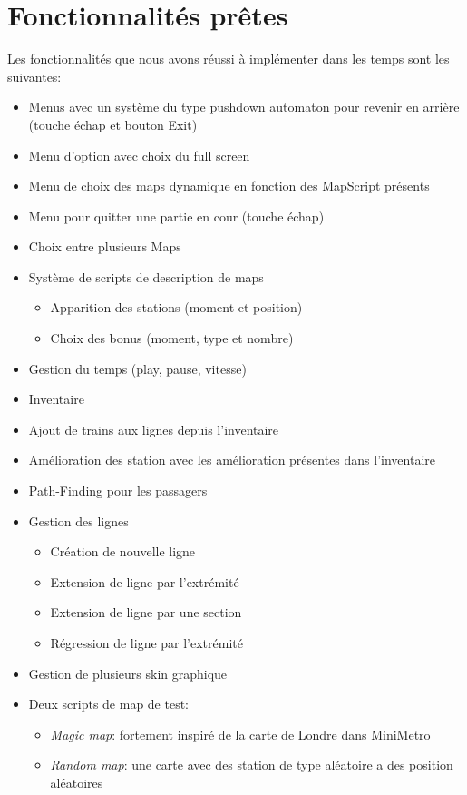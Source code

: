\documentclass[report, backcover, french, nodocumentinfo]{upmethodology-document}
\begin{document}
	\section*{Fonctionnalités prêtes}
		\p{}
		Les fonctionnalités que nous avons réussi à implémenter dans les temps sont les suivantes:
		\begin{itemize}
			\item Menus avec un système du type pushdown automaton pour revenir en arrière (touche échap et bouton Exit)
			\item Menu d'option avec choix du full screen
			\item Menu de choix des maps dynamique en fonction des MapScript présents
			\item Menu pour quitter une partie en cour (touche échap)
			\item Choix entre plusieurs Maps
			\item Système de scripts de description de maps
				\begin{itemize}
					\item Apparition des stations (moment et position)
					\item Choix des bonus (moment, type et nombre)
				\end{itemize}
			\item Gestion du temps (play, pause, vitesse)
			\item Inventaire
			\item Ajout de trains aux lignes depuis l'inventaire
			\item Amélioration des station avec les amélioration présentes dans l'inventaire
			\item Path-Finding pour les passagers
			\item Gestion des lignes
				\begin{itemize}
					\item Création de nouvelle ligne
					\item Extension de ligne par l'extrémité
					\item Extension de ligne par une section
					\item Régression de ligne par l'extrémité
				\end{itemize}
			\item Gestion de plusieurs skin graphique
			\item Deux scripts de map de test:
				\begin{itemize}
					\item \textit{Magic map}: fortement inspiré de la carte de Londre dans MiniMetro
					\item \textit{Random map}: une carte avec des station de type aléatoire a des position aléatoires
				\end{itemize}
		\end{itemize}
\end{document}
